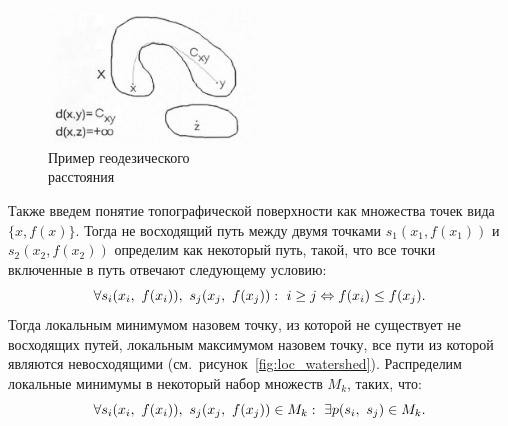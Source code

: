 \documentclass[14pt, a4paper]{extreport}
\begin{document}
	\begin{figure}[h!]
		\centering
		\includegraphics[width = 0.5\textwidth]{image/chapter_2/gerodesic_distance}	
		\caption{Пример геодезического \\ расстояния}
		\label{fig:gerodesic_distance}
	\end{figure}
	Также введем понятие топографической поверхности как множества точек вида $\{x, f(x)\}$. Тогда не восходящий путь между двумя точками $s_1(x_1,f(x_1))$ и $s_2(x_2,f(x_2))$ определим как некоторый путь, такой, что все точки включенные в путь отвечают следующему условию:\vspace*{-0.3cm}
	\begin{equation*}
		\forall s_i(x_i,~f(x_i)),~s_j(x_j,~f(x_j)):~i\ge j \Leftrightarrow f(x_i) \le f(x_j).
		\vspace*{-0.3cm}
		\label{z_X(Y_i)}
	\end{equation*}
	Тогда локальным минимумом назовем точку, из которой не существует не восходящих путей, локальным максимумом назовем точку, все пути из которой являются невосходящими (см.~рисунок~\ref{fig:loc_watershed}). Распределим локальные минимумы в некоторый набор множеств $M_k$, таких, что:\vspace*{-0.3cm}
	\begin{equation*}
		\forall s_i(x_i,~f(x_i)),~s_j(x_j,~f(x_j)) \in M_k:~\exists p(s_i,~s_j) \in M_k.
		\vspace*{-0.3cm}
		\label{z_X(Y_i)}
	\end{equation*}
	
\end{document}
